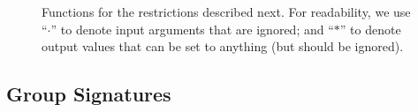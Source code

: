 \begin{figure}[ht!]
  \caption{Functions for the \CUASGen restrictions described next.
    For readability, we use ``$\cdot$'' to denote input arguments that are
    ignored; and ``$\ast$'' to denote output values that can be set to anything
    (but should be ignored).}
  \label{fig:func-restrictions}
\end{figure}

\subsection{Group Signatures}
\label{ssec:related-models-gs}

